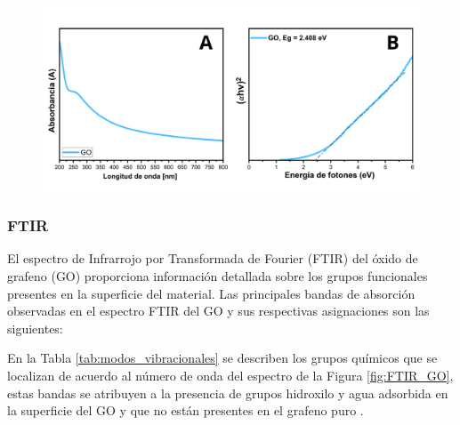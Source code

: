 \documentclass[12pt]{article}
\begin{document}
\begin{figure}[H]
    	   \begin{center}
     	  	\includegraphics[width = 1\textwidth]{Imagenes/GO_BandGab_2.png}
    	   \end{center} 
        \end{figure}
        
\subsubsection{FTIR}
El espectro de Infrarrojo por Transformada de Fourier (FTIR) del óxido de grafeno (GO) proporciona información detallada sobre los grupos funcionales presentes en la superficie del material. Las principales bandas de absorción observadas en el espectro FTIR del GO y sus respectivas asignaciones son las siguientes:\vspace{1em} %


En la Tabla \ref{tab:modos_vibracionales} se describen los grupos químicos que se localizan de acuerdo al número de onda del espectro de la Figura \ref{fig:FTIR_GO}, estas bandas se atribuyen a la presencia de grupos hidroxilo y agua adsorbida en la superficie del GO y que no están presentes en el grafeno puro \cite{IEEEreferencias:GO_2,IEEEreferencias:GO_4,IEEEreferencias:GO_8}.\vspace{1em} %
\end{document}
